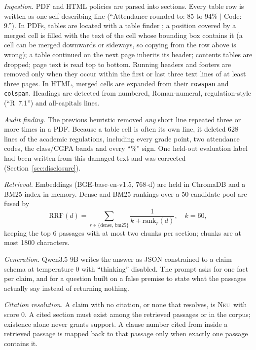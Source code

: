\documentclass[conference]{IEEEtran}
\newcommand{\NEU}{\textsc{Neu}}
\newcommand{\code}[1]{\texttt{#1}}
\begin{document}
\textit{Ingestion.} PDF and HTML policies are parsed into sections. Every table row is written as one
self-describing line (``Attendance rounded to: 85 to 94\% $|$ Code: 9.''). In PDFs, tables are located with
a table finder \cite{pymupdf}; a position covered by a merged cell is filled with the text of the cell whose
bounding box contains it (a cell can be merged downwards or sideways, so copying from the row above is
wrong); a table continued on the next page inherits its header; contents tables are dropped; page text is
read top to bottom. Running headers and footers are removed only when they occur within the first or last
three text lines of at least three pages. In HTML, merged cells are expanded from their \code{rowspan} and
\code{colspan}. Headings are detected from numbered, Roman-numeral, regulation-style (``R~7.1'') and
all-capitals lines.

\textit{Audit finding.} The previous heuristic removed \emph{any} short line repeated three or more times in
a PDF. Because a table cell is often its own line, it deleted 628 lines of the academic regulations,
including every grade point, two attendance codes, the class/CGPA bands and every ``\%'' sign. One held-out
evaluation label had been written from this damaged text and was corrected (Section~\ref{sec:disclosure}).

\textit{Retrieval.} Embeddings (BGE-base-en-v1.5, 768-d) are held in ChromaDB and a BM25 index in memory.
Dense and BM25 rankings over a 50-candidate pool are fused by
\begin{equation}
\mathrm{RRF}(d)=\sum_{r\in\{\mathrm{dense},\,\mathrm{bm25}\}}\frac{1}{k+\mathrm{rank}_r(d)},\quad k=60,
\end{equation}
keeping the top 6 passages with at most two chunks per section; chunks are at most 1800 characters.

\textit{Generation.} Qwen3.5 9B \cite{qwen3,qwen35} writes the answer as JSON constrained to a claim schema
at temperature 0 with ``thinking'' disabled. The prompt asks for one fact per claim, and for a question
built on a false premise to state what the passages actually say instead of returning nothing.

\textit{Citation resolution.} A claim with no citation, or none that resolves, is \NEU\ with score 0. A
cited section must exist among the retrieved passages or in the corpus; existence alone never grants
support. A clause number cited from inside a retrieved passage is mapped back to that passage only when
exactly one passage contains it.
\end{document}
